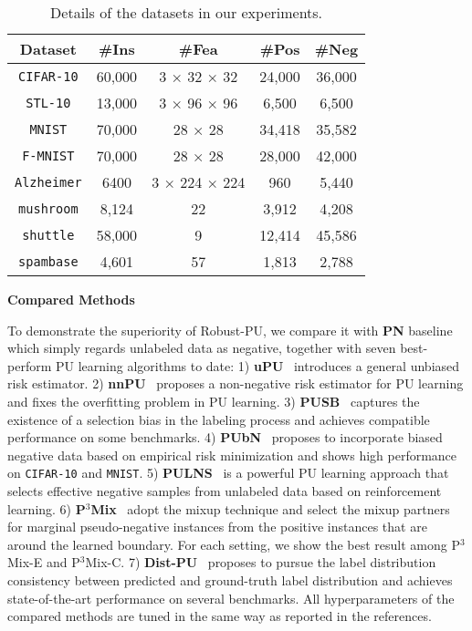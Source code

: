 \documentclass[sigconf]{acmart}
\newcommand{\ourmethod}{Robust-PU\xspace}
\begin{document}
\begin{table}[htbp]
    \caption{Details of the datasets in our experiments.}
    \centering
    \begin{tabular}{ccccc}\toprule
         Dataset & \#Ins & \#Fea & \#Pos & \#Neg\\
         \midrule
         \texttt{CIFAR-10} & 60,000 & 3 × 32 × 32 & 24,000 & 36,000\\
         \texttt{STL-10} & 13,000 & 3 × 96 × 96 & 6,500 & 6,500\\
         \texttt{MNIST} & 70,000 & 28 × 28 & 34,418 & 35,582\\
         \texttt{F-MNIST} & 70,000 & 28 × 28 & 28,000 & 42,000\\
         \texttt{Alzheimer} & 6400 & 3 × 224 × 224 & 960 & 5,440\\
         \texttt{mushroom} & 8,124 & 22 & 3,912 & 4,208\\
         \texttt{shuttle} & 58,000 & 9 & 12,414 & 45,586\\
         \texttt{spambase} & 4,601 & 57 & 1,813 & 2,788\\
         \bottomrule
    \end{tabular}
    \label{tab:dataset}
\end{table}

\noindent\textbf{Compared Methods}

To demonstrate the superiority of \ourmethod, we compare it with \textbf{PN} baseline which simply regards unlabeled data as negative, together with seven best-perform PU learning algorithms to date: 1) \textbf{uPU}~\cite{du2014analysis} introduces a general unbiased risk estimator. 2) \textbf{nnPU}~\cite{kiryo2017positive} proposes a non-negative risk estimator for PU learning and fixes the overfitting problem in PU learning. 3) \textbf{PUSB}~\cite{kato2018learning} captures the existence of a selection bias in the labeling process and achieves compatible performance on some benchmarks. 4) \textbf{PUbN}~\cite{hsieh2019classification} proposes to incorporate biased negative data based on empirical risk minimization and shows high performance on \texttt{CIFAR-10} and \texttt{MNIST}. 5) \textbf{PULNS}~\cite{luo2021pulns} is a powerful PU learning approach that selects effective negative samples from unlabeled data based on reinforcement learning. 6) \textbf{P$^3$Mix}~\cite{li2022your} adopt the mixup technique and select the mixup partners for marginal pseudo-negative instances from the positive instances that are around the learned boundary. For each setting, we show the best result among P$^3$Mix-E and P$^3$Mix-C. 7) \textbf{Dist-PU}~\cite{zhao2022dist} proposes to pursue the label distribution consistency between predicted and ground-truth label distribution and achieves state-of-the-art performance on several benchmarks. All hyperparameters of the compared methods are tuned in the same way as reported in the references.
\end{document}
